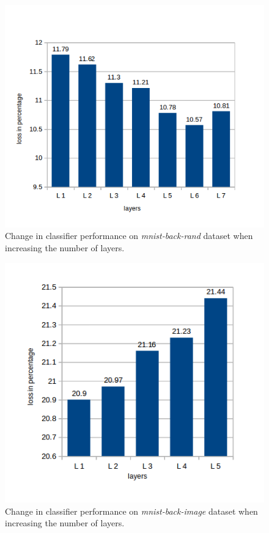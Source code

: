 \begin{figure}
  \centering
  \captionsetup{justification=centering,margin=0.1cm}
  \includegraphics[scale=0.65]{figures/mkm_rand}
  \caption{Change in classifier performance on \textit{mnist-back-rand} dataset when increasing the number of layers.}
  \label{mkm_rand}
\end{figure}

\begin{figure}
  \centering
  \captionsetup{justification=centering,margin=0.1cm}
  \includegraphics[scale=0.65]{figures/mkm_image}
  \caption{Change in classifier performance on \textit{mnist-back-image} dataset when increasing the number of layers.}
  \label{mkm_image}
\end{figure}

